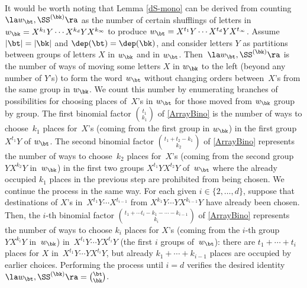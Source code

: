 \begin{Remark}
It would be worth noting that 
Lemma \ref{dS-mono} 
can be derived from
counting~$\la w_{\bt}, \SS^{(\bk)} \ra$ 
as the number of certain shufflings of letters in
$w_\bk=X^{k_1}Y\cdots X^{k_d}YX^{k_\infty}$
to produce 
$w_\bt=X^{t_1}Y\cdots X^{t_d}YX^{t_\infty}$.
Assume 
$|\bt|=|\bk|$ and $\dep(\bt)=\dep(\bk)$,
and consider letters $Y$ as partitions between 
groups of letters $X$ in $w_\bk$ and in $w_\bt$. 
Then~$\la w_{\bt}, \SS^{(\bk)} \ra$ is the number of ways
of moving some letters $X$ in $w_\bk$
to the left (beyond any number of $Y$'s)
to form the word $w_\bt$
without changing orders between~$X$'s from the same group
in $w_\bk$.
We count this number 
by enumerating branches of possibilities
for choosing
places of~$X$'s in $w_\bt$ for those moved from 
$w_\bk$ group by group. 
The first binomial factor $\binom{t_1}{k_1}$
of \eqref{ArrayBino} is the number of ways to choose~$k_1$ places for~$X$'s (coming from 
the first group in $w_\bk$) in the first group $X^{t_1}Y$ of $w_\bt$.
The second binomial factor $\binom{t_1+t_2-k_1}{k_2}$ of \eqref{ArrayBino} 
represents the number of ways to choose~$k_2$ 
places for~$X$'s (coming from the second group $YX^{k_2}Y$ in~$w_\bk$)
 in the first two groups $X^{t_1}YX^{t_2}Y$ of~$w_\bt$ 
where the already occupied $k_1$ places in the previous step
are prohibited from being chosen.
We continue the process in the same way. For each given 
$i\in\{2,\dots,d\}$, suppose that destinations of $X$'s 
in~$X^{t_1}Y\cdots X^{t_{i-1}}$ 
from $X^{k_1}Y\cdots YX^{k_{i-1}}Y$ have already been
chosen. Then, the $i$-th binomial
factor $\binom{t_1+\cdots t_i-k_1-\cdots-k_{i-1}}{k_i}$ 
of \eqref{ArrayBino}
represents the number of ways to choose $k_i$ places for 
$X$'s (coming from the $i$-th group $YX^{k_i}Y$ in~$w_\bk$)
in~$X^{t_1}Y\cdots YX^{t_i}Y$ (the first $i$ groups of~$w_\bt$):
there are $t_1+\cdots+t_i$ places for $X$ in~$X^{t_1}Y\cdots YX^{t_i}Y$,
but already $k_1+\cdots+k_{i-1}$ places are occupied 
by earlier choices.
Performing the process until $i=d$ 
verifies the desired identity
$\la w_\bt, \SS^{(\bk)} \ra=\binom{\bt}{\bk}$.
\end{Remark}


